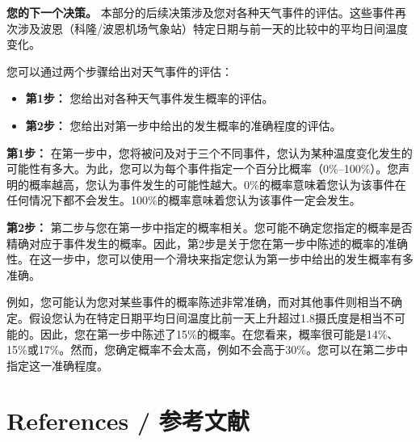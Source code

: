 \documentclass[12pt,a4paper]{article}
\newenvironment{translation}
  {\par\noindent\color{transblue}\ignorespaces}
  {\par\medskip\medskip}
\begin{document}
\begin{translation}
\textbf{您的下一个决策。} 本部分的后续决策涉及您对各种天气事件的评估。这些事件再次涉及波恩（科隆/波恩机场气象站）特定日期与前一天的比较中的平均日间温度变化。

您可以通过两个步骤给出对天气事件的评估：
\begin{itemize}
  \item \textbf{第1步：} 您给出对各种天气事件发生概率的评估。
  \item \textbf{第2步：} 您给出对第一步中给出的发生概率的准确程度的评估。
\end{itemize}

\textbf{第1步：} 在第一步中，您将被问及对于三个不同事件，您认为某种温度变化发生的可能性有多大。为此，您可以为每个事件指定一个百分比概率（0\%--100\%）。您声明的概率越高，您认为事件发生的可能性越大。0\%的概率意味着您认为该事件在任何情况下都不会发生。100\%的概率意味着您认为该事件一定会发生。

\textbf{第2步：} 第二步与您在第一步中指定的概率相关。您可能不确定您指定的概率是否精确对应于事件发生的概率。因此，第2步是关于您在第一步中陈述的概率的准确性。在这一步中，您可以使用一个滑块来指定您认为第一步中给出的发生概率有多准确。

例如，您可能认为您对某些事件的概率陈述非常准确，而对其他事件则相当不确定。假设您认为在特定日期平均日间温度比前一天上升超过1.8摄氏度是相当不可能的。因此，您在第一步中陈述了15\%的概率。在您看来，概率很可能是14\%、15\%或17\%。然而，您确定概率不会太高，例如不会高于30\%。您可以在第二步中指定这一准确程度。
\end{translation}

\newpage
\section*{References / 参考文献}
\end{document}

